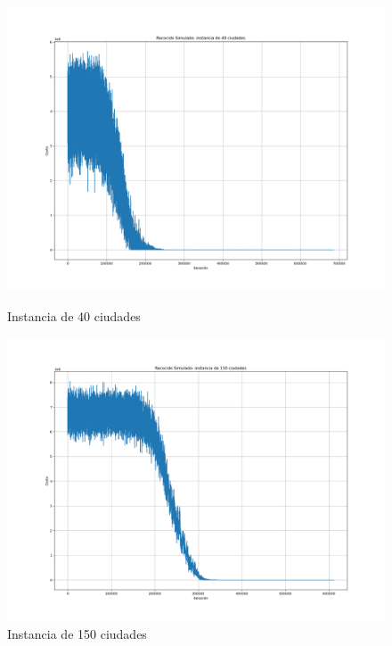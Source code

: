 \documentclass[spanish,12pt,letterpaper]{article}
\begin{document}
	
	\begin{figure}[ht]
		\begin{minipage}[b]{0.5\linewidth}
			\centering
			\includegraphics[width=1\linewidth]{images/40.png}
			\caption{Instancia de 40 ciudades}
			\label{fig:40ciudades}
		\end{minipage}
		\begin{minipage}[b]{0.5\linewidth}
			\centering
			\includegraphics[width=1\linewidth]{images/150.png}
			\caption{Instancia de 150 ciudades}
			\label{fig:150ciudades}
		\end{minipage}
	\end{figure}

	
\end{document}
